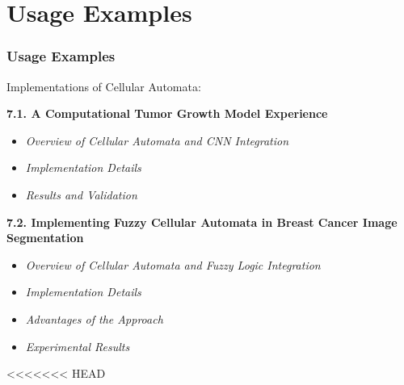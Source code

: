 \documentclass{beamer}
\begin{document}
\section{Usage Examples}
\begin{frame}
    \frametitle{Usage Examples}
    Implementations of Cellular Automata:
    
    \textbf{7.1. A Computational Tumor Growth Model Experience}
    \begin{itemize}
        \item \textit{Overview of Cellular Automata and CNN Integration}
        \item \textit{Implementation Details}
        \item \textit{Results and Validation}
    \end{itemize}
    
    \textbf{7.2. Implementing Fuzzy Cellular Automata in Breast Cancer Image Segmentation}
    \begin{itemize}
        \item \textit{Overview of Cellular Automata and Fuzzy Logic Integration}
        \item \textit{Implementation Details}
        \item \textit{Advantages of the Approach}
        \item \textit{Experimental Results}
    \end{itemize}
\end{frame}

<<<<<<< HEAD
\end{document}

